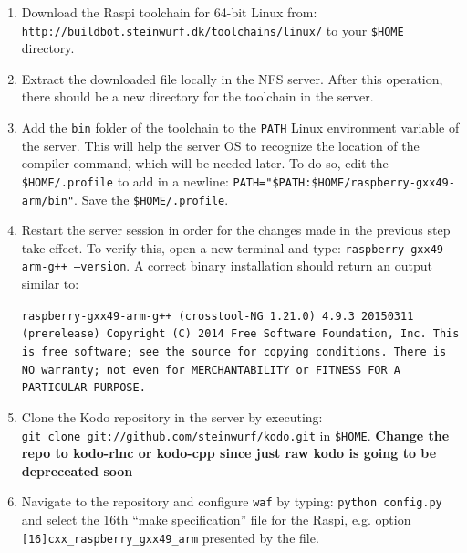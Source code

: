 \begin{enumerate}

\item Download the \ac{Raspi} toolchain for 64-bit Linux from: \\
\texttt{http://buildbot.steinwurf.dk/toolchains/linux/} to your
\texttt{\$HOME} directory. \\

\item Extract the downloaded file locally in the NFS server. After
this operation, there should be a new directory for the toolchain
in the server. \\

\item Add the \texttt{bin} folder of the toolchain to the \texttt{PATH}
Linux environment variable of the server. This will help the server OS
to recognize the location of the compiler command, which will be needed
later. To do so, edit the \texttt{\$HOME/.profile} to add in a newline:
\texttt{PATH="\$PATH:\$HOME/raspberry-gxx49-arm/bin"}. Save the
\texttt{\$HOME/.profile}. \\

\item Restart the server session in order for the changes made in the
previous step take effect. To verify this, open a new terminal and type:
\texttt{raspberry-gxx49-arm-g++ --version}. A correct binary installation
should return an output similar to:

\texttt{raspberry-gxx49-arm-g++ (crosstool-NG 1.21.0) 4.9.3 20150311 (prerelease)
Copyright (C) 2014 Free Software Foundation, Inc.
This is free software; see the source for copying conditions.  There is NO
warranty; not even for MERCHANTABILITY or FITNESS FOR A PARTICULAR PURPOSE.} \\

\item Clone the Kodo repository in the server by executing: \\
\texttt{git clone git://github.com/steinwurf/kodo.git} in \texttt{\$HOME}.
\textbf{Change the repo to kodo-rlnc or kodo-cpp since just raw kodo is going
to be depreceated soon} \\

\item Navigate to the repository and configure \texttt{waf} by typing:
\texttt{python config.py} and select the 16th ``make specification'' file
for the \ac{Raspi}, e.g. option \texttt{[16]cxx\_raspberry\_gxx49\_arm}
presented by the file.


\end{enumerate}
